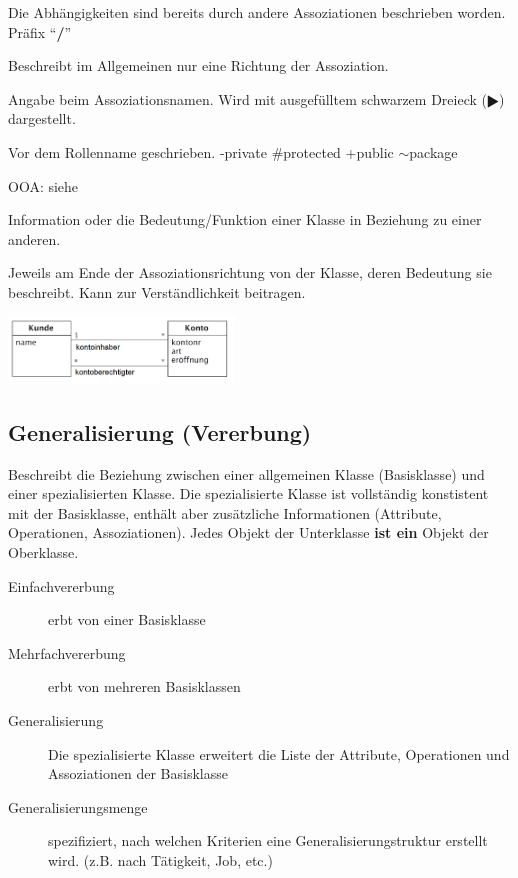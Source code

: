 \begin{description}
    \item[abgeleitete Assoziation] 
      Die Abhängigkeiten sind bereits durch andere Assoziationen beschrieben worden.
      Präfix "`\textbf{/}"'
    \item[Assoziationsname] 
      Beschreibt im Allgemeinen nur eine Richtung der Assoziation. 
    \item[Leserichtung] 
      Angabe beim Assoziationsnamen. Wird mit ausgefülltem schwarzem Dreieck ($\RHD$) dargestellt.
    \item[Sichtbarkeit] 
      Vor dem Rollenname geschrieben. -private \#protected +public $\sim$package
    \item[Eigenschaftswert] 
      OOA: siehe 
      
    \parbox{8cm}{
      \item[Rolle]
        Information oder die Bedeutung/Funktion einer Klasse in Beziehung zu einer anderen.
      \item[Rollenname]
        Jeweils am Ende der Assoziationsrichtung von der Klasse, 
        deren Bedeutung sie beschreibt. Kann zur Verständlichkeit beitragen.}
    \hspace{0.5cm}
    \parbox{6cm}{\includegraphics[width=6cm]{./bilder/Rolle.png}}
  \end{description}

\subsection{Generalisierung (Vererbung) }
  Beschreibt die Beziehung zwischen einer allgemeinen Klasse (Basisklasse) und
  einer spezialisierten Klasse. Die spezialisierte Klasse ist vollständig
  konstistent mit der Basisklasse, enthält aber zusätzliche Informationen
  (Attribute, Operationen, Assoziationen). Jedes Objekt der Unterklasse \textbf{ist ein} 
  Objekt der Oberklasse.
  
  \begin{description}
    \item[Einfachvererbung]
      erbt von einer Basisklasse
    \item[Mehrfachvererbung]
      erbt von mehreren Basisklassen
    \item[Generalisierung] 
      Die spezialisierte Klasse erweitert die Liste der
      Attribute, Operationen und Assoziationen der Basisklasse
    \item[Generalisierungsmenge] 
      spezifiziert, nach welchen Kriterien eine Generalisierungstruktur erstellt wird.
      (z.B. nach Tätigkeit, Job, etc.)
  \end{description}

